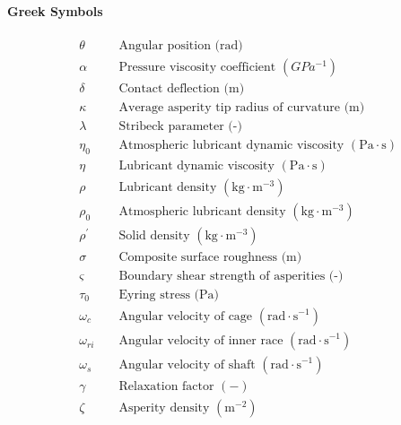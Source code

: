 \paragraph{Greek Symbols}
\begin{align*}
	&\theta && \text { Angular position (rad) } \\
	&\alpha && \text { Pressure viscosity coefficient }\left(GPa^{-1}\right) \\
	&\delta && \text { Contact deflection (m) } \\
	&\kappa && \text { Average asperity tip radius of curvature (m) } \\
	&\lambda && \text { Stribeck parameter (-) } \\
	&\eta_0 && \text { Atmospheric lubricant dynamic viscosity }\left(\mathrm{Pa} \cdot \mathrm{s}\right) \\
	&\eta && \text { Lubricant dynamic viscosity }\left(\mathrm{Pa} \cdot \mathrm{s}\right) \\
	&\rho && \text { Lubricant density }\left(\mathrm{kg} \cdot \mathrm{m}^{-3} \right) \\
	&\rho_0 && \text { Atmospheric lubricant density }\left(\mathrm{kg} \cdot \mathrm{m}^{-3} \right) \\
	&\rho^{\prime} && \text { Solid density }\left(\mathrm{kg} \cdot \mathrm{m}^{-3} \right) \\
	&\sigma && \text { Composite surface roughness (m) } \\
	&\varsigma && \text { Boundary shear strength of asperities (-) } \\
	&\tau_0 && \text { Eyring stress (Pa) } \\
	&\omega_c && \text { Angular velocity of cage }\left(\mathrm{rad \cdot s}^{-1}\right) \\
	&\omega_{r i} && \text { Angular velocity of inner race }\left(\mathrm{rad \cdot s}^{-1}\right) \\
	&\omega_s && \text { Angular velocity of shaft }\left(\mathrm{rad \cdot s}^{-1}\right) \\
	&\gamma && \text { Relaxation factor }(-) \\
	&\zeta && \text { Asperity density }\left(\mathrm{m}^{-2}\right) \\
\end{align*}

